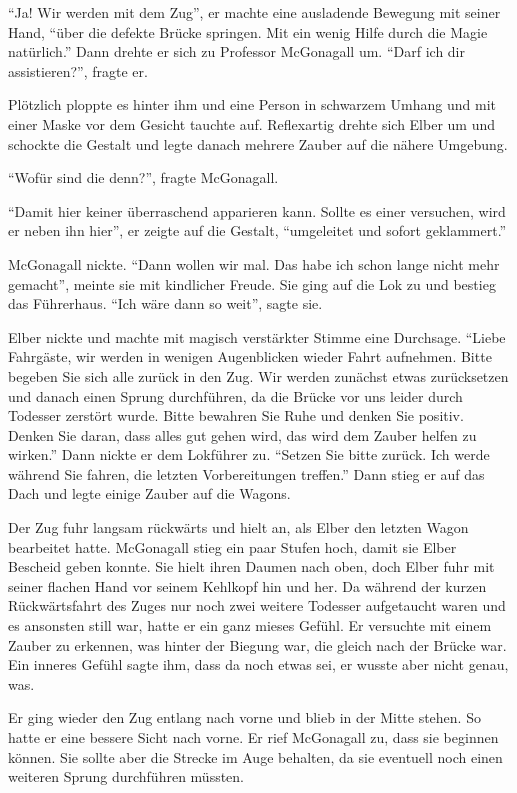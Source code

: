 \enquote{Ja! Wir werden mit dem Zug}, er machte eine ausladende Bewegung mit seiner Hand, \enquote{über die defekte Brücke springen. Mit ein wenig Hilfe durch die Magie natürlich.} Dann drehte er sich zu Professor McGonagall um. \enquote{Darf ich dir assistieren?}, fragte er.

Plötzlich ploppte es hinter ihm und eine Person in schwarzem Umhang und mit einer Maske vor dem Gesicht tauchte auf. Reflexartig drehte sich Elber um und schockte die Gestalt und legte danach mehrere Zauber auf die nähere Umgebung.

\enquote{Wofür sind die denn?}, fragte McGonagall.

\enquote{Damit hier keiner überraschend apparieren kann. Sollte es einer versuchen, wird er neben ihn hier}, er zeigte auf die Gestalt, \enquote{umgeleitet und sofort geklammert.}

McGonagall nickte. \enquote{Dann wollen wir mal. Das habe ich schon lange nicht mehr gemacht}, meinte sie mit kindlicher Freude. Sie ging auf die Lok zu und bestieg das Führerhaus. \enquote{Ich wäre dann so weit}, sagte sie.

Elber nickte und machte mit magisch verstärkter Stimme eine Durchsage. \enquote{Liebe Fahrgäste, wir werden in wenigen Augenblicken wieder Fahrt aufnehmen. Bitte begeben Sie sich alle zurück in den Zug. \gst Wir werden zunächst etwas zurücksetzen und danach einen Sprung durchführen, da die Brücke vor uns leider durch Todesser zerstört wurde. \gst Bitte bewahren Sie Ruhe und denken Sie positiv. Denken Sie daran, dass alles gut gehen wird, das wird dem Zauber helfen zu wirken.} Dann nickte er dem Lokführer zu. \enquote{Setzen Sie bitte zurück. Ich werde während Sie fahren, die letzten Vorbereitungen treffen.} Dann stieg er auf das Dach und legte einige Zauber auf die Wagons.

Der Zug fuhr langsam rückwärts und hielt an, als Elber den letzten Wagon bearbeitet hatte. McGonagall stieg ein paar Stufen hoch, damit sie Elber Bescheid geben konnte. Sie hielt ihren Daumen nach oben, doch Elber fuhr mit seiner flachen Hand vor seinem Kehlkopf hin und her. Da während der kurzen Rückwärtsfahrt des Zuges nur noch zwei weitere Todesser aufgetaucht waren und es ansonsten still war, hatte er ein ganz mieses Gefühl. Er versuchte mit einem Zauber zu erkennen, was hinter der Biegung war, die gleich nach der Brücke war. Ein inneres Gefühl sagte ihm, dass da noch etwas sei, er wusste aber nicht genau, was.

Er ging wieder den Zug entlang nach vorne und blieb in der Mitte stehen. So hatte er eine bessere Sicht nach vorne. Er rief McGonagall zu, dass sie beginnen können. Sie sollte aber die Strecke im Auge behalten, da sie eventuell noch einen weiteren  Sprung durchführen müssten.

